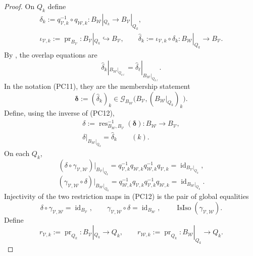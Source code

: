 \begin{proof}
  On $Q_k$ define
  \[
  \begin{gathered}
    \delta_k:=q_{\mathcal V,k}^{-1}\circ q_{\mathcal W,k}
      \colon B_{\mathcal W}|_{Q_k}\to B_{\mathcal V}|_{Q_k},\\
    \iota_{\mathcal V,k}:=\operatorname{pr}_{B_{\mathcal V}}\colon
      B_{\mathcal V}|_{Q_k}\hookrightarrow B_{\mathcal V},\qquad
    \widehat\delta_k:=\iota_{\mathcal V,k}\circ\delta_k
      \colon B_{\mathcal W}|_{Q_k}\to B_{\mathcal V}.
  \end{gathered}
  \]
  By ,
  the overlap equations are
  \[
    \widehat\delta_k|_{B_{\mathcal W}|_{Q_{k\ell}}}
      =\widehat\delta_\ell|_{B_{\mathcal W}|_{Q_{k\ell}}}.
  \]
  In the notation (PC11), they are the membership statement
  \[
    \mathbf\delta:=(\widehat\delta_k)_k
      \in\mathscr G_{B_{\mathcal W}}
        \bigl(B_{\mathcal V},(B_{\mathcal W}|_{Q_k})_k\bigr).
  \]
  Define, using the inverse of (PC12),
  \[
  \begin{gathered}
    \delta:=\operatorname{res}_{B_{\mathcal W},B_{\mathcal V}}^{-1}
      (\mathbf\delta)\colon B_{\mathcal W}\to B_{\mathcal V},\\
    \delta|_{B_{\mathcal W}|_{Q_k}}=\widehat\delta_k
      \qquad(k).
  \end{gathered}
  \]
  On each $Q_k$,
  \[
    (\delta\circ\gamma_{\mathcal V,\mathcal W})
      |_{B_{\mathcal V}|_{Q_k}}
      =q_{\mathcal V,k}^{-1}q_{\mathcal W,k}
        q_{\mathcal W,k}^{-1}q_{\mathcal V,k}
      =\operatorname{id}_{B_{\mathcal V}|_{Q_k}},
  \]
  \[
    (\gamma_{\mathcal V,\mathcal W}\circ\delta)
      |_{B_{\mathcal W}|_{Q_k}}
      =q_{\mathcal W,k}^{-1}q_{\mathcal V,k}
        q_{\mathcal V,k}^{-1}q_{\mathcal W,k}
      =\operatorname{id}_{B_{\mathcal W}|_{Q_k}}.
  \]
  Injectivity of the two restriction maps in (PC12) is the pair of global
  equalities
  \[
    \delta\circ\gamma_{\mathcal V,\mathcal W}
      =\operatorname{id}_{B_{\mathcal V}},\qquad
    \gamma_{\mathcal V,\mathcal W}\circ\delta
      =\operatorname{id}_{B_{\mathcal W}},\qquad
    \operatorname{IsIso}(\gamma_{\mathcal V,\mathcal W}).        \tag{CCR10}
  \]
  Define
  \[
    r_{\mathcal V,k}:=\operatorname{pr}_{Q_k}\colon
      B_{\mathcal V}|_{Q_k}\to Q_k,\qquad
    r_{\mathcal W,k}:=\operatorname{pr}_{Q_k}\colon
      B_{\mathcal W}|_{Q_k}\to Q_k.
\]
\end{proof}
